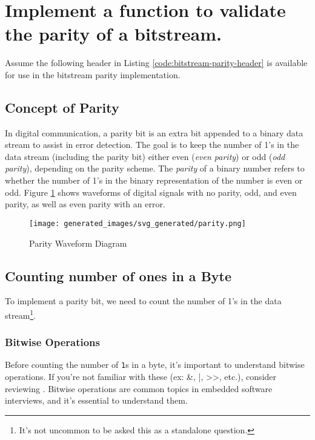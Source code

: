 \documentclass[main.tex]{subfiles}
\begin{document}
\section{Implement a function to validate the parity of a bitstream.}
Assume the following header in Listing \ref{code:bitstream-parity-header} is available for use in the bitstream parity implementation. 



\spoilerline

\subsection{Concept of Parity}
In digital communication, a parity bit is an extra bit appended to a binary data stream to assist in error detection. The goal is to keep the number of 1's in the data stream (including the parity bit) either even (\textit{even parity}) or odd (\textit{odd parity}), depending on the parity scheme. The \textit{parity} of a binary number refers to whether the number of 1's in the binary representation of the number is even or odd. Figure \ref{fig:parity-waveform-diagram} shows waveforms of digital signals with no parity, odd, and even parity, as well as even parity with an error. 

\begin{figure}[H]
    \centering
    \texttt{[image: generated\_images/svg\_generated/parity.png]}
    \caption{Parity Waveform Diagram}
    \label{fig:parity-waveform-diagram}
\end{figure}

\subsection {Counting number of ones in a Byte}
To implement a parity bit, we need to count the number of 1's in the data stream\footnote{It's not uncommon to be asked this as a standalone question.}. 
\subsubsection{Bitwise Operations}
Before counting the number of \texttt{1}s in a byte, it’s important to understand bitwise operations. If you’re not familiar with these (ex: \&, |, >>, etc.), consider reviewing . Bitwise operations are common topics in embedded software interviews, and it's essential to understand them.
\end{document}

